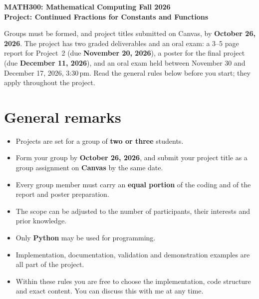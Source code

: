 \documentclass[11pt,a4paper]{article}
\begin{document}
\begin{center}
  {\large\bfseries MATH300: Mathematical Computing \textperiodcentered{} Fall 2026}\\[6pt]
  {\Large\bfseries Project: Continued Fractions for Constants and Functions}
\end{center}
\vspace{6pt}

Groups must be formed, and project titles submitted on Canvas, by
\textbf{October 26, 2026}. The project
has two graded deliverables and an oral exam: a 3--5 page report for
Project~2 (due \textbf{November 20, 2026}), a poster for the final project
(due \textbf{December 11, 2026}), and an oral exam held between November 30
and December 17, 2026, 3:30\,pm. Read the general rules below before you
start; they apply throughout the project.

\section*{General remarks}
\begin{itemize}
  \item Projects are set for a group of \textbf{two or three} students.
  \item Form your group by \textbf{October 26, 2026}, and submit your
        project title as a group assignment on \textbf{Canvas} by the same
        date.
  \item Every group member must carry an \textbf{equal portion} of the coding
        and of the report and poster preparation.
  \item The scope can be adjusted to the number of participants, their
        interests and prior knowledge.
  \item Only \textbf{Python} may be used for programming.
  \item Implementation, documentation, validation and demonstration examples
        are all part of the project.
  \item Within these rules you are free to choose the implementation, code
        structure and exact content. You can discuss this with me at any time.
\end{itemize}
\end{document}
